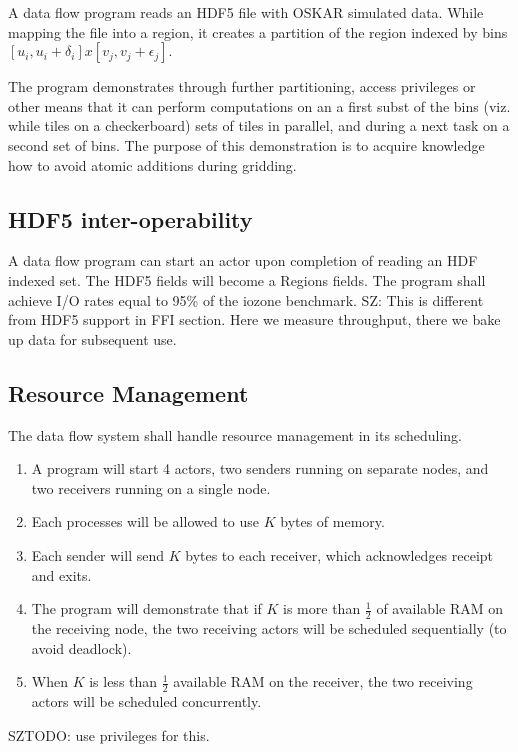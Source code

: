 \documentclass[11pt,a4paper]{article}
\begin{document}
A data flow program reads an HDF5 file with OSKAR simulated data.  While mapping the file into a region, it creates a partition of the region indexed by bins $[u_i, u_i + \delta_i] x [v_j, v_j + \epsilon_j].$  

The program demonstrates through further partitioning, access privileges or other means that it can perform computations on an a first subst of the bins (viz. while tiles on a checkerboard) sets of tiles in parallel, and during a next task on a second set of bins.  The purpose of this demonstration is to acquire knowledge how to avoid atomic additions during gridding.

\subsection{HDF5 inter-operability}

A data flow program can start an actor upon completion of reading an HDF indexed set.  The HDF5 fields will become a Regions fields.  The program shall achieve I/O rates equal to 95\% of the iozone benchmark. 
SZ: This is different from HDF5 support in FFI section. Here we measure throughput, there we bake up data for subsequent use.

\subsection{Resource Management}

The data flow system shall handle resource management in its scheduling.

\begin{enumerate}
    \item A program will start 4 actors, two senders running on separate nodes, and two receivers running on a single node.
    \item Each processes will be allowed to use $K$ bytes of memory.
    \item Each sender will send $K$ bytes to each receiver, which acknowledges receipt and exits.
    \item The program will demonstrate that if $K$ is more than $\frac{1}{2}$ of available RAM on the receiving node, the two receiving actors will be scheduled sequentially (to avoid deadlock). \item When $K$ is less than $\frac{1}{2}$ available RAM on the receiver, the two receiving actors will be scheduled concurrently.
\end{enumerate}

SZTODO: use privileges for this.
\end{document}

